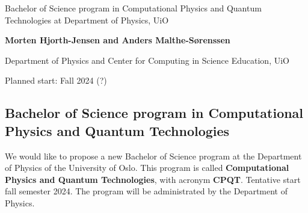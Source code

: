 \documentclass[%
oneside,                 %
final,                   %
10pt]{article}
\begin{document}

\newcommand{\exercisesection}[1]{\subsection*{#1}}






\thispagestyle{empty}

\begin{center}
{\LARGE\bf
\begin{spacing}{1.25}
Bachelor of Science program in Computational Physics and Quantum Technologies  at Department of Physics, UiO
\end{spacing}
}
\end{center}


\begin{center}
{\bf Morten Hjorth-Jensen and Anders Malthe-Sørenssen}
\end{center}

    \begin{center}
\centerline{{\small Department of Physics and Center for Computing in Science Education, UiO}}
\end{center}
    


\begin{center}
Planned start: Fall 2024 (?)
\end{center}

\vspace{1cm}


\subsection{Bachelor of Science program in Computational Physics and Quantum Technologies}

We would like to propose a new Bachelor of Science program at the
Department of Physics of the University of Oslo. This program is
called \textbf{Computational Physics and Quantum Technologies}, with acronym
\textbf{CPQT}. Tentative start fall semester 2024.
The program will be administrated by the Department of Physics. 
\end{document}
